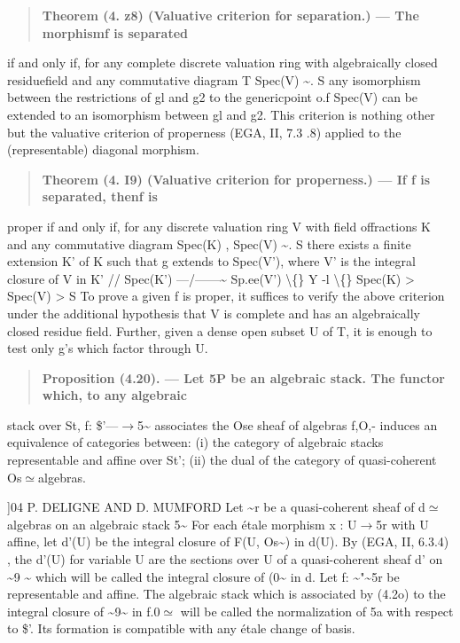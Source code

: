\documentclass[11pt]{article}
\theoremstyle{plain}
\theoremstyle{definition}
\theoremstyle{remark}
\begin{document}
\begin{quote}\textbf{Theorem (4. z8) (Valuative criterion for separation.) --- The morphismf is separated}\end{quote}
if and only if, for any complete discrete valuation ring with algebraically closed residuefield and any commutative diagram T Spec(V) \textasciitilde{}. S any isomorphism between the restrictions of gl and g2 to the genericpoint o.f Spec(V) can be extended to an isomorphism between gl and g2. This criterion is nothing other but the valuative criterion of properness (EGA, II, 7.3 .8) applied to the (representable) diagonal morphism.

\begin{quote}\textbf{Theorem (4. I9) (Valuative criterion for properness.) --- If f is separated, thenf is}\end{quote}
proper if and only if, for any discrete valuation ring V with field offractions K and any commutative diagram Spec(K) , Spec(V) \textasciitilde{}. S there exists a finite extension K' of K such that g extends to Spec(V'), where V' is the integral closure of V in K' // Spec(K') ---/------\textasciitilde{} Sp.ee(V') \textbackslash\{\} Y -l \textbackslash\{\} Spec(K) > Spec(V) > S To prove a given f is proper, it suffices to verify the above criterion under the additional hypothesis that V is complete and has an algebraically closed residue field. Further, given a dense open subset U of T, it is enough to test only g's which factor through U.

\begin{quote}\textbf{Proposition (4.20). --- Let 5P be an algebraic stack. The functor which, to any algebraic}\end{quote}
stack over St, f: \$'---$\to$5\textasciitilde{} associates the Ose sheaf of algebras f,O,- induces an equivalence of categories between: (i) the category of algebraic stacks representable and affine over St'; (ii) the dual of the category of quasi-coherent Os$\simeq$algebras.

]04 P. DELIGNE AND D. MUMFORD Let \textasciitilde{}r be a quasi-coherent sheaf of d$\simeq$algebras on an algebraic stack 5\textasciitilde{} For each \'etale morphism x : U$\to$5r with U affine, let d'(U) be the integral closure of F(U, Os\textasciitilde{}) in d(U). By (EGA, II, 6.3.4) , the d'(U) for variable U are the sections over U of a quasi-coherent sheaf d' on \textasciitilde{}9 \textasciitilde{} which will be called the integral closure of (0\textasciitilde{} in d. Let f: \textasciitilde{}"\textasciitilde{}5r be representable and affine. The algebraic stack which is associated by (4.2o) to the integral closure of \textasciitilde{}9\textasciitilde{} in f.0$\simeq$ will be called the normalization of 5a with respect to \$'. Its formation is compatible with any \'etale change of basis.
\end{document}
